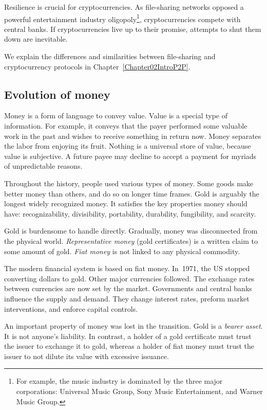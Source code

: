 Resilience is crucial for cryptocurrencies.
As file-sharing networks opposed a powerful entertainment industry oligopoly\footnote{For example, the music industry is dominated by the three major corporations: Universal Music Group, Sony Music Entertainment, and Warner Music Group.}, cryptocurrencies compete with central banks.
If cryptocurrencies live up to their promise, attempts to shut them down are inevitable.

We explain the differences and similarities between file-sharing and cryptocurrency protocols in Chapter~\ref{Chapter02IntroP2P}.


\subsection{Evolution of money}

Money is a form of language to convey value.
Value is a special type of information.
For example, it conveys that the payer performed some valuable work in the past and wishes to receive something in return now.
Money separates the labor from enjoying its fruit.
Nothing is a universal store of value, because value is subjective.
A future payee may decline to accept a payment for myriads of unpredictable reasons.

Throughout the history, people used various types of money.
Some goods make better money than others, and do so on longer time frames.
Gold is arguably the longest widely recognized money.
It satisfies the key properties money should have: recognizability, divisibility, portability, durability, fungibility, and scarcity.

Gold is burdensome to handle directly.
Gradually, money was disconnected from the physical world.
\textit{Representative money} (gold certificates) is a written claim to some amount of gold.
\textit{Fiat money} is not linked to any physical commodity.

The modern financial system is based on fiat money.
In~1971, the US stopped converting dollars to gold.
Other major currencies followed.
The exchange rates between currencies are now set by the market.
Governments and central banks influence the supply and demand.
They change interest rates, preform market interventions, and enforce capital controls.

An important property of money was lost in the transition.
Gold is a \textit{bearer asset}.
It is not anyone's liability.
In contrast, a holder of a gold certificate must trust the issuer to exchange it to gold, whereas a holder of fiat money must trust the issuer to not dilute its value with excessive issuance.


